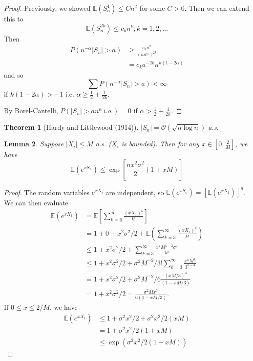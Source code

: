 \documentclass[10pt, oneside, reqno]{amsart}
\theoremstyle{plain}%
\newtheorem{thm}{Theorem}[section]
\newtheorem{lem}[thm]{Lemma}
\theoremstyle{definition}
\theoremstyle{remark}
\newcommand{\E}{\mathbb{E}}
\begin{document}
\begin{proof}
    Previously, we showed $\E(S_n^4) \leq Cn^2$ for some $C > 0$.  Then we can extend this to \[
        \E(S_n^{2k}) \leq c_k n^k, k = 1, 2, \dots
    \] Then \begin{align*}
        P(n^{-\alpha} |S_n| > a ) &\geq \frac{c_k n^k}{(a n^{\alpha})^{2k}} \\
                                &= c_k a^{-2k} n^{k(1-2\alpha)}
    \end{align*} and so \[
        \sum P( n^{-\alpha} |S_n| > a) < \infty 
    \] if $k(1-2\alpha) > -1$ i.e. $\alpha \geq \frac{1}{2} + \frac{1}{2k}$.  
    
    By Borel-Cantelli, $P(|S_n| > an^{\alpha} \, i.o.) = 0$ if $\alpha > \frac{1}{2} + \frac{1}{2k}$.  
\end{proof} 
\begin{thm}[Hardy and Littlewood (1914)] $|S_n| = \mathcal{O}(\sqrt{n \log n})$ a.s.
\end{thm}
\begin{lem}
    Suppose $|X_i| \leq M$ a.s. ($X_i$ is bounded).  Then for any $x \in [0, \frac{2}{M}]$, we have \[
        \E(e^{x S_n}) \leq \exp[ \frac{nx^2 \sigma^2}{2}(1 + xM)]
    \]  
\end{lem}

\begin{proof}
    The random variables $e^{x X_i}$ are independent, so $\E(e^{x S_n}) = \left[ \E(e^{x X_1})\right]^n$.  We can then evaluate 
    \begin{align*}
        \E(e^{x X_1}) &= \E \left[ \sum_{k=0}^\infty \frac{(x X_1)^k}{k!} \right] \\
        &= 1 +0 + x^2 \sigma^2/2 + \E(\sum_{k=3}^\infty \frac{(x X_1)^k}{k!}) \\
        &\leq 1 + x^2 \sigma^2/2 + \sum_{k=3}^\infty \frac{x^k M^{k-2} \sigma^2}{k!} \\
        & \leq 1  + x^2 \sigma^2/2 + \sigma^2 M^{-2}/3! \sum_{k=3}^\infty \frac{x^k M^k}{3^{k-3}} \\
        &= 1 + x^2 \sigma^2/2 + \sigma^2 M^{-2}/6  \frac{ (xM/3)^3}{(1-xM/3)} \\
        &= 1 + x^2 \sigma^2/2 = \frac{\sigma^2 M x^3}{6(1-xM/3)}.
    \end{align*}  If $0 \leq x \leq 2/M$, we have \begin{align*}    
    \E(e^{x X_1})   &\leq 1 + \sigma^2 x^2/2 + \sigma^2 x^2 /2(xM) \\
                        &= 1 + \sigma^2 x^2/2(1 + xM) \\
                        &\leq \exp(\sigma^2 x^2/2(1 + xM))
    \end{align*}

\end{proof}
\end{document}
